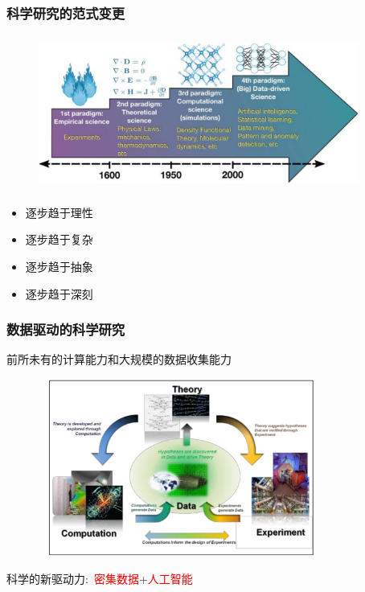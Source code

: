 \frame
{
	\frametitle{科学研究的范式变更}
\begin{figure}[h!]
\vspace*{-0.28in}
\centering
\includegraphics[height=2.00in,width=4.15in]{Figures/Four_Model_3.png}
\label{Four_Model}
\end{figure}
\begin{minipage}[b]{0.48\textwidth}
 {\fontsize{7.5pt}{6.0pt}\selectfont\begin{itemize}%
	 \setlength{\itemsep}{10pt}
 \item 逐步趋于理性
 \item 逐步趋于复杂
 \end{itemize}}
\end{minipage}
\hfill
\begin{minipage}[b]{0.48\textwidth}
 {\fontsize{7.5pt}{6.0pt}\selectfont\begin{itemize}%
	 \setlength{\itemsep}{10pt}
 \item 逐步趋于抽象
 \item 逐步趋于深刻
 \end{itemize}}
\end{minipage}
}

\frame
{
	\frametitle{数据驱动的科学研究}
前所未有的计算能力和大规模的数据收集能力%
\begin{figure}[h!]
\centering
\includegraphics[height=2.30in,width=3.70in]{Figures/Four_Model_1.png}
\label{Four_Model_1}
\end{figure}
科学的新驱动力:~\textcolor{red}{密集数据}+\textcolor{red}{人工智能}\\
}

